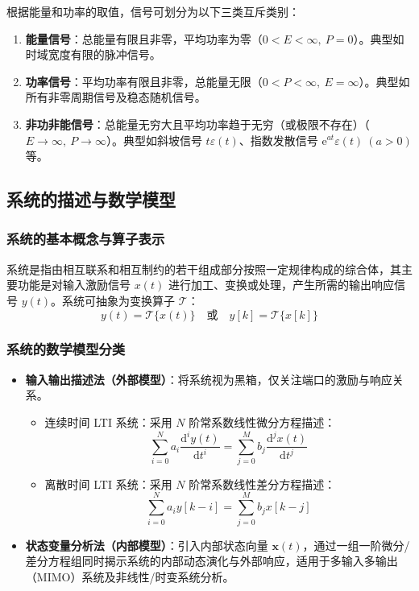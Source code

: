\documentclass[11pt,a4paper,fontset=fandol]{ctexart}
\theoremstyle{remark}
\begin{document}
根据能量和功率的取值，信号可划分为以下三类互斥类别：
\begin{enumerate}
    \item \textbf{能量信号}：总能量有限且非零，平均功率为零（$0 < E < \infty,\ P = 0$）。典型如时域宽度有限的脉冲信号。
    \item \textbf{功率信号}：平均功率有限且非零，总能量无限（$0 < P < \infty,\ E = \infty$）。典型如所有非零周期信号及稳态随机信号。
    \item \textbf{非功非能信号}：总能量无穷大且平均功率趋于无穷（或极限不存在）（$E \to \infty,\ P \to \infty$）。典型如斜坡信号 $t\varepsilon(t)$、指数发散信号 $\mathrm{e}^{at}\varepsilon(t) \ (a>0)$ 等。
\end{enumerate}

\subsection{系统的描述与数学模型}

\subsubsection{系统的基本概念与算子表示}
系统是指由相互联系和相互制约的若干组成部分按照一定规律构成的综合体，其主要功能是对输入激励信号 $x(t)$ 进行加工、变换或处理，产生所需的输出响应信号 $y(t)$。系统可抽象为变换算子 $\mathcal{T}$：
\begin{equation}
    y(t) = \mathcal{T}\{x(t)\} \quad \text{或} \quad y[k] = \mathcal{T}\{x[k]\}
\end{equation}

\subsubsection{系统的数学模型分类}
\begin{itemize}
    \item \textbf{输入输出描述法（外部模型）}：将系统视为黑箱，仅关注端口的激励与响应关系。
    \begin{itemize}
        \item 连续时间 LTI 系统：采用 $N$ 阶常系数线性微分方程描述：
        \begin{equation}
            \sum_{i=0}^N a_i \frac{\mathrm{d}^i y(t)}{\mathrm{d}t^i} = \sum_{j=0}^M b_j \frac{\mathrm{d}^j x(t)}{\mathrm{d}t^j}
        \end{equation}
        \item 离散时间 LTI 系统：采用 $N$ 阶常系数线性差分方程描述：
        \begin{equation}
            \sum_{i=0}^N a_i y[k - i] = \sum_{j=0}^M b_j x[k - j]
        \end{equation}
    \end{itemize}
    \item \textbf{状态变量分析法（内部模型）}：引入内部状态向量 $\bm{x}(t)$，通过一组一阶微分/差分方程组同时揭示系统的内部动态演化与外部响应，适用于多输入多输出（MIMO）系统及非线性/时变系统分析。
\end{itemize}
\end{document}
